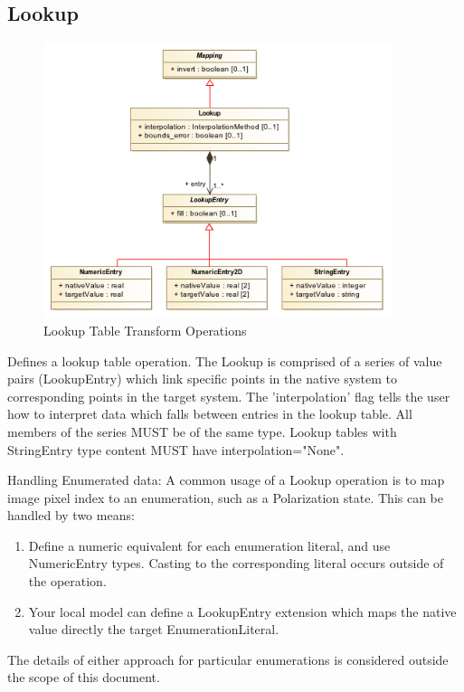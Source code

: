   \subsection{Lookup}
  \label{sect:Lookup}

    \begin{figure}[h]
    \begin{center}
      \includegraphics[width=4in]{diagrams/lookup_operations.png}
      \caption{Lookup Table Transform Operations}\label{fig:LookupOps}
    \end{center}
    \end{figure}

    Defines a lookup table operation. The Lookup is comprised of a series of value pairs (LookupEntry) which link specific points in the native system to corresponding points in the target system. The 'interpolation' flag tells the user how to interpret data which falls between entries in the lookup table. All members of the series MUST be of the same type. Lookup tables with StringEntry type content MUST have interpolation="None". 

    Handling Enumerated data: A common usage of a Lookup operation is to map image pixel index to an enumeration, such as a Polarization state. This can be handled by two means:
    \begin{enumerate}
    \item Define a numeric equivalent for each enumeration literal, and use NumericEntry types. Casting to the corresponding literal occurs outside of the operation. 
    \item Your local model can define a LookupEntry extension which maps the native value directly the target EnumerationLiteral. 
    \end{enumerate}
    The details of either approach for particular enumerations is considered outside the scope of this document.

